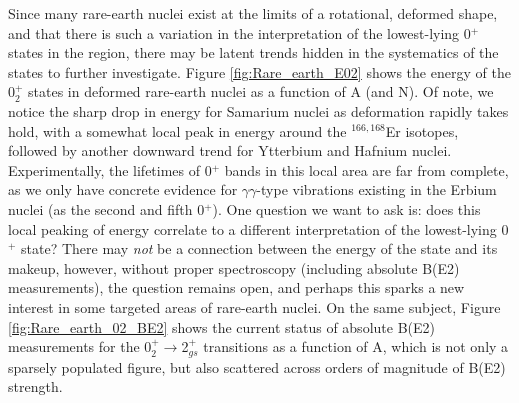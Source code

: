 Since many rare-earth nuclei exist at the limits of a rotational, deformed shape, and that there is such a variation in the interpretation of the lowest-lying 0$^+$ states in the region, there may be latent trends hidden in the systematics of the states to further investigate. Figure \ref{fig:Rare_earth_E02} shows the energy of the 0$^+_2$ states in deformed rare-earth nuclei as a function of A (and N). Of note, we notice the sharp drop in energy for Samarium nuclei as deformation rapidly takes hold, with a somewhat local peak in energy around the $^{166,168}$Er isotopes, followed by another downward trend for Ytterbium and Hafnium nuclei. Experimentally, the lifetimes of 0$^+$ bands in this local area are far from complete, as we only have concrete evidence for $\gamma\gamma$-type vibrations existing in the Erbium nuclei (as the second and fifth 0$^+$). One question we want to ask is: does this local peaking of energy correlate to a different interpretation of the lowest-lying 0$^+$ state? There may \textit{not} be a connection between the energy of the state and its makeup, however, without proper spectroscopy (including absolute B(E2) measurements), the question remains open, and perhaps this sparks a new interest in some targeted areas of rare-earth nuclei. On the same subject, Figure \ref{fig:Rare_earth_02_BE2} shows the current status of absolute B(E2) measurements for the 0$^+_2\rightarrow$2$^+_{gs}$ transitions as a function of A, which is not only a sparsely populated figure, but also scattered across orders of magnitude of B(E2) strength. 

